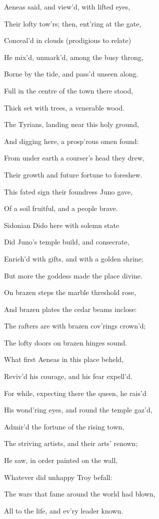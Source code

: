 Aeneas said, and view’d, with lifted eyes,

Their lofty tow’rs; then, ent’ring at the gate,

Conceal’d in clouds (prodigious to relate)

He mix’d, unmark’d, among the busy throng,

Borne by the tide, and pass’d unseen along.

Full in the centre of the town there stood,

Thick set with trees, a venerable wood.

The Tyrians, landing near this holy ground,

And digging here, a prosp’rous omen found:

From under earth a courser’s head they drew,

Their growth and future fortune to foreshew.

This fated sign their foundress Juno gave,

Of a soil fruitful, and a people brave.

Sidonian Dido here with solemn state

Did Juno’s temple build, and consecrate,

Enrich’d with gifts, and with a golden shrine;

But more the goddess made the place divine.

On brazen steps the marble threshold rose,

And brazen plates the cedar beams inclose:

The rafters are with brazen cov’rings crown’d;

The lofty doors on brazen hinges sound.

What first Aeneas in this place beheld,

Reviv’d his courage, and his fear expell’d.

For while, expecting there the queen, he rais’d

His wond’ring eyes, and round the temple gaz’d,

Admir’d the fortune of the rising town,

The striving artists, and their arts’ renown;

He saw, in order painted on the wall,

Whatever did unhappy Troy befall:

The wars that fame around the world had blown,

All to the life, and ev’ry leader known.

